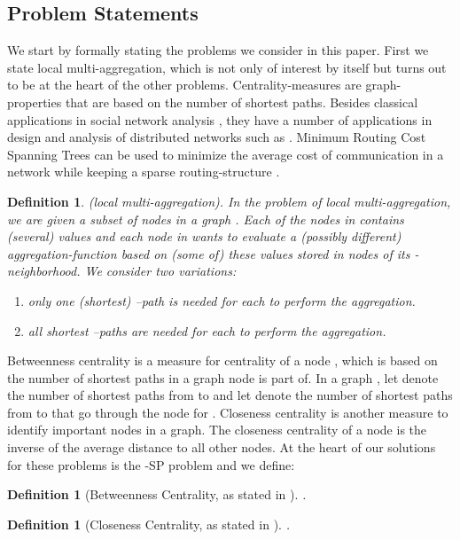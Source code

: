 \documentclass[11pt]{article}
\newtheorem{definition}[theorem]{Definition}
\begin{document}
\subsection{Problem Statements}
We start by formally stating the problems we consider in this paper. First we state local multi-aggregation, which is not only of interest by itself but turns out to be at the heart of the other problems. Centrality-measures are graph-properties that are based on the number of shortest paths. Besides classical applications in social network analysis \cite{carrington2005models,wasserman1994social}, they have a number of applications in design and analysis of distributed networks such as \cite{aggarwal2010survey,borgatti2005centrality,daly2007social}. Minimum Routing Cost Spanning Trees can be used to minimize the average cost of communication in a network while keeping a sparse routing-structure \cite{hu1974optimum,wong1980worst}. 
 \begin{definition}(local multi-aggregation).
In the problem of local multi-aggregation, we are given a subset  of nodes  in a graph . Each of the nodes in  contains (several) values and each node in  wants to evaluate a (possibly different) aggregation-function based on (some of) these values stored in nodes of its -neighborhood.
We consider two variations:
\begin{enumerate}
\item only one (shortest) --path is needed for each  to perform the aggregation.
\item all shortest --paths are needed for each  to perform the aggregation.
\end{enumerate}\end{definition}


Betweenness centrality is a measure for centrality of a node , which is based on the number of shortest paths in a graph  node  is part of. In a graph , let  denote the number of shortest paths from  to  and let  denote the number of shortest paths from  to  that go through the node  for . Closeness centrality is another measure to identify important nodes in a graph. The closeness centrality of a node is the inverse of the average distance to all other nodes. At the heart of our solutions for these problems is the -SP problem and we define:

\begin{definition}[Betweenness Centrality, as stated in \cite{freeman1977}] .
\end{definition}

\begin{definition}[Closeness Centrality, as stated in \cite{beauchamp1965}] .
\end{definition}
\end{document}
